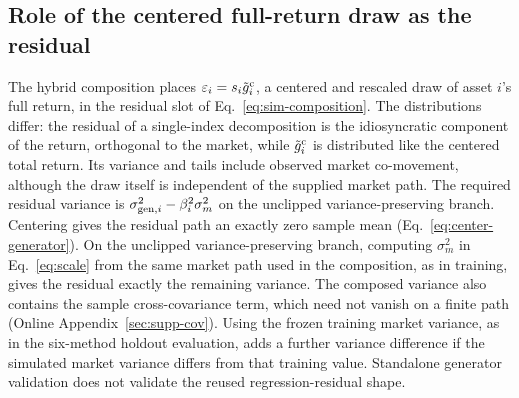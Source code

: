 \subsection{Role of the centered full-return draw as the residual}
\label{sec:supp-residual-choice}

The hybrid composition places $\varepsilon_i = s_i \tilde{g}_i^{\mathrm c}$, a
centered and rescaled draw of asset $i$'s full return, in the residual
slot of Eq.~\eqref{eq:sim-composition}. The distributions differ: the residual of a single-index decomposition is the
idiosyncratic component of the return, orthogonal to the market, while
$\tilde{g}_i^{\mathrm c}$ is distributed like the centered total return. Its variance and tails include observed market co-movement, although
the draw itself is independent of the supplied market path.
The required residual variance is $\sigma_{\mathrm{gen},i}^2 - \beta_i^2 \sigma_m^2$ on the unclipped variance-preserving branch. Centering
gives the residual path an exactly zero sample mean
(Eq.~\eqref{eq:center-generator}). On the unclipped variance-preserving
branch, computing $\sigma_m^2$ in Eq.~\eqref{eq:scale} from the same
market path used in the composition, as in training, gives the
residual exactly the remaining variance. The composed variance also
contains the sample cross-covariance term, which need not vanish on a
finite path (Online Appendix~\ref{sec:supp-cov}). Using the frozen
training market variance, as in the six-method holdout evaluation,
adds a further variance difference if the simulated market variance
differs from that training value. Standalone generator validation does not validate the reused regression-residual shape.

